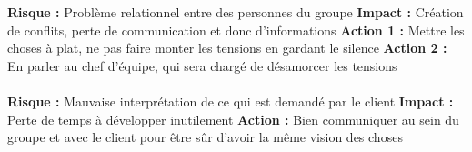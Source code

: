 \textbf{Risque : } Problème relationnel entre des personnes du groupe
\newline
\textbf{Impact : } Création de conflits, perte de communication et donc d’informations
\newline
\textbf{Action 1 : } Mettre les choses à plat, ne pas faire monter les tensions en gardant le silence
\newline
\textbf{Action 2 : } En parler au chef d’équipe, qui sera chargé de désamorcer les tensions

\paragraph{}

\textbf{Risque : } Mauvaise interprétation de ce qui est demandé par le client
\newline
\textbf{Impact : } Perte de temps à développer inutilement
\newline
\textbf{Action : } Bien communiquer au sein du groupe et avec le client pour être sûr d’avoir la même vision des choses













